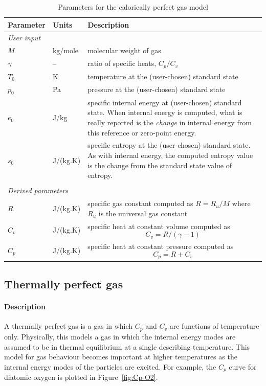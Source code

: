 \begin{table}[h]
\caption{Parameters for the calorically perfect gas model}
\label{tab:cal-perfect-params}
\begin{tabular}{llp{10cm}}
\toprule
Parameter & Units & Description \\ \midrule
\multicolumn{3}{l}{\textit{User input}} \\
$M$       & kg/mole & molecular weight of gas \\
$\gamma$  &  --    & ratio of specific heats, $C_p/C_v$ \\
$T_0$     & K      & temperature at the (user-chosen) standard state \\
$p_0$     & Pa     & pressure at the (user-chosen) standard state \\
$e_0$     & J/kg   & specific internal energy at (user-chosen) standard state.
                    When internal energy is computed, what is really 
                    reported is the \emph{change} in internal energy
                    from this reference or zero-point energy. \\
$s_0$     & J/(kg.K) & specific entropy at the (user-chosen) standard state.
                       As with internal energy, the computed entropy value
                       is the change from the standard state value of entropy. \\
 & & \\
\multicolumn{3}{l}{\textit{Derived parameters}} \\
$R$      & J/(kg.K) & specific gas constant computed as $R = R_u/M$ where
                      $R_u$ is the universal gas constant \\
$C_v$    & J/(kg.K) & specific heat at constant volume computed as \[C_v = R/(\gamma - 1)\] \\
$C_p$    & J/(kg.K) & specific heat at constant pressure computed as \[C_p = R + C_v\] \\
\bottomrule
\end{tabular}
\end{table}

\subsection{Thermally perfect gas}
\label{sec:therm-perf}
\paragraph{Description}
A thermally perfect gas is a gas in which $C_p$ and $C_v$ are functions of temperature
only.
Physically, this models a gas in which the internal energy modes are assumed to be
in thermal equilibrium at a single describing temperature.
This model for gas behaviour becomes important at higher temperatures as the 
internal energy modes of the particles are excited.
For example, the $C_p$ curve for diatomic oxygen is plotted in 
Figure~\ref{fig:Cp-O2}.

